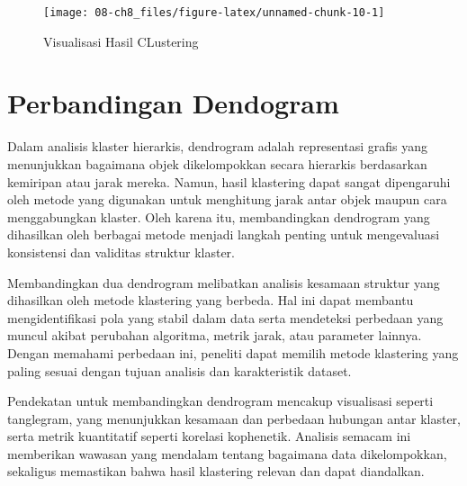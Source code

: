 \documentclass[
  oneside]{book}
\begin{document}
\begin{figure}[h]

{\centering \texttt{[image: 08-ch8\_files/figure-latex/unnamed-chunk-10-1]} 

}

\caption{Visualisasi Hasil CLustering}\label{fig:unnamed-chunk-10}
\end{figure}

\section{Perbandingan Dendogram}\label{perbandingan-dendogram}

Dalam analisis klaster hierarkis, dendrogram adalah representasi grafis yang menunjukkan bagaimana objek dikelompokkan secara hierarkis berdasarkan kemiripan atau jarak mereka. Namun, hasil klastering dapat sangat dipengaruhi oleh metode yang digunakan untuk menghitung jarak antar objek maupun cara menggabungkan klaster. Oleh karena itu, membandingkan dendrogram yang dihasilkan oleh berbagai metode menjadi langkah penting untuk mengevaluasi konsistensi dan validitas struktur klaster.

Membandingkan dua dendrogram melibatkan analisis kesamaan struktur yang dihasilkan oleh metode klastering yang berbeda. Hal ini dapat membantu mengidentifikasi pola yang stabil dalam data serta mendeteksi perbedaan yang muncul akibat perubahan algoritma, metrik jarak, atau parameter lainnya. Dengan memahami perbedaan ini, peneliti dapat memilih metode klastering yang paling sesuai dengan tujuan analisis dan karakteristik dataset.

Pendekatan untuk membandingkan dendrogram mencakup visualisasi seperti tanglegram, yang menunjukkan kesamaan dan perbedaan hubungan antar klaster, serta metrik kuantitatif seperti korelasi kophenetik. Analisis semacam ini memberikan wawasan yang mendalam tentang bagaimana data dikelompokkan, sekaligus memastikan bahwa hasil klastering relevan dan dapat diandalkan.
\end{document}

